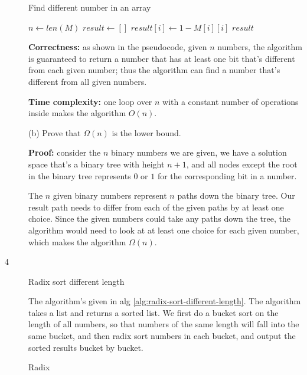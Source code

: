 \documentclass{article}
\begin{document}
\begin{description}
  \begin{algorithm}[H]
  \caption{Find different number in an array}
  \label{alg:find-different-binary-number}
    \begin{algorithmic}[1]
    
      \State $n \gets len(M)$
      \State $result \gets []$
        \State $result[i] \gets 1 - M[i][i]$
      \EndFor
      \State \Return $result$
    \EndFunction

    \end{algorithmic}
  \end{algorithm}

  \textbf{Correctness:} as shown in the pseudocode, given $n$ numbers, the algorithm is guaranteed to return a number that has at least one bit that's different from each given number; thus the algorithm can find a number that's different from all given numbers.

  \textbf{Time complexity:} one loop over $n$ with a constant number of operations inside makes the algorithm $O(n)$.

  (b) Prove that $\Omega(n)$ is the lower bound.

  \textbf{Proof:} consider the $n$ binary numbers we are given, we have a solution space that's a binary tree with height $n + 1$, and all nodes except the root in the binary tree represents $0$ or $1$ for the corresponding bit in a number. 

  The $n$ given binary numbers represent $n$ paths down the binary tree. Our result path needs to differ from each of the given paths by at least one choice. Since the given numbers could take any paths down the tree, the algorithm would need to look at at least one choice for each given number, which makes the algorithm $\Omega(n)$. 

\item[4]{Radix sort different length}

  The algorithm's given in alg \ref{alg:radix-sort-different-length}. The algorithm takes a list and returns a sorted list. We first do a bucket sort on the length of all numbers, so that numbers of the same length will fall into the same bucket, and then radix sort numbers in each bucket, and output the sorted results bucket by bucket.

  \begin{algorithm}[H]
  \caption{Radix}
  \label{alg:radix-sort-different-length}
    \begin{algorithmic}[1]
    

\end{algorithmic}
\end{algorithm}
\end{description}
\end{document}
